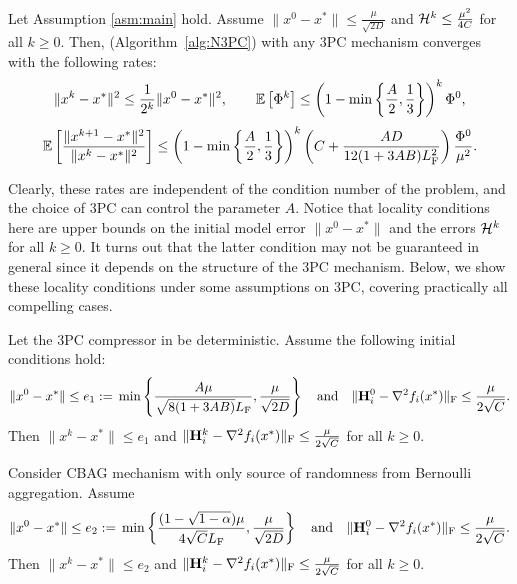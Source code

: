 \documentclass[11pt]{article}
\begin{document}
	\begin{theorem}\label{th:NLU}
		Let Assumption \ref{asm:main} hold. Assume $\|x^0-x^*\| \leq \frac{\mu}{\sqrt{2D}}$ and ${\cal H}^k \leq \frac{\mu^2}{4C}$ for all $k\geq 0$. Then,  (Algorithm~\ref{alg:N3PC}) with any 3PC mechanism converges with the following rates:
		\begin{equation}\label{rate:local-linear-iter}
			\squeeze
			\|x^k - x^*\|^2 \leq  \frac{1}{2^k}   \|x^0-x^*\|^2, \qquad \E\ll\Phi^k\rr \leq  \left(  1 - \min\left\{  \frac{A}{2}, \frac{1}{3}  \right\}  \right)^k\Phi^0,
		\end{equation}
		\begin{equation}\label{rate:local-superlinear-iter}
			\squeeze
			\E\ll\frac{\|x^{k+1}-x^*\|^2}{\|x^k-x^*\|^2}\rr \leq  \left(  1 - \min\left\{  \frac{A}{2}, \frac{1}{3}  \right\}  \right)^k \left(  C + \frac{AD}{12(1+3AB)\HF^2}  \right) \frac{\Phi^0}{\mu^2}. 
		\end{equation}    
	\end{theorem}
	
	Clearly, these rates are independent of the condition number of the problem, and the choice of 3PC can control the parameter $A$. Notice that locality conditions here are upper bounds on the initial model error $\|x^0-x^*\|$ and the errors ${\mathcal{H}}^k$ for all $k\ge0$. It turns out that the latter condition may not be guaranteed in general since it depends on the structure of the 3PC mechanism. Below, we show these locality conditions under some assumptions on 3PC, covering practically all compelling cases.
	
	\begin{lemma}[Deterministic 3PC]\label{lm:boundforbiased}
		Let the 3PC compressor in  be deterministic. Assume the following initial conditions hold: $$\|x^0 - x^*\| \le e_1 \; { := }\; \min\left\{ \frac{A\mu}{\sqrt{8(1+3AB)}L_{\rm F}}, \frac{\mu}{\sqrt{2D}}  \right\} \quad\text{and}\quad \|\mathbf{H}_i^0 - \nabla^2 f_i(x^*)\|_{\rm F} \leq \frac{\mu}{2\sqrt{C}}.$$
		Then $\|x^k-x^*\| \leq e_1$ and $\|\mathbf{H}_i^k - \nabla^2 f_i(x^*)\|_{\rm F}  \leq \frac{\mu}{2\sqrt{C}}$ for all $k\geq 0$. 
	\end{lemma}
	
	\begin{lemma}[CBAG]\label{lm:boundforcbag}
		Consider CBAG mechanism with only source of randomness from Bernoulli aggregation. Assume $$\|x^0 - x^*\| \le e_2 \; { := }\; \min\left\{  \frac{(1-\sqrt{1-\alpha})\mu}{4\sqrt{C}L_{\rm F}}, \frac{\mu}{\sqrt{2D}}  \right\} \quad\text{and}\quad \|\mathbf{H}_i^0 - \nabla^2 f_i(x^*)\|_{\rm F} \leq \frac{\mu}{2\sqrt{C}}.$$
		Then $\|x^k-x^*\| \leq e_2$ and $\|\mathbf{H}_i^k - \nabla^2 f_i(x^*)\|_{\rm F}  \leq \frac{\mu}{2\sqrt{C}}$ for all $k\geq 0$. 
	\end{lemma}
	
\end{document}

